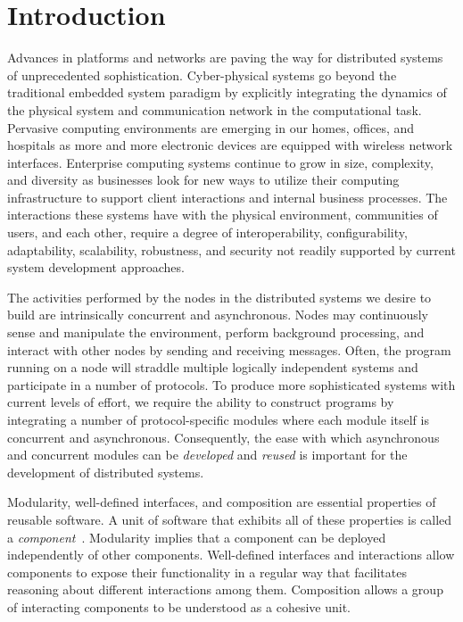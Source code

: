 \section{Introduction\label{introduction}}

Advances in platforms and networks are paving the way for distributed systems of unprecedented sophistication.
Cyber-physical systems go beyond the traditional embedded system paradigm by explicitly integrating the dynamics of the physical system and communication network in the computational task.
Pervasive computing environments are emerging in our homes, offices, and hospitals as more and more electronic devices are equipped with wireless network interfaces.
Enterprise computing systems continue to grow in size, complexity, and diversity as businesses look for new ways to utilize their computing infrastructure to support client interactions and internal business processes.
The interactions these systems have with the physical environment, communities of users, and each other, require a degree of interoperability, configurability, adaptability, scalability, robustness, and security not readily supported by current system development approaches.

The activities performed by the nodes in the distributed systems we desire to build are intrinsically concurrent and asynchronous.
Nodes may continuously sense and manipulate the environment, perform background processing, and interact with other nodes by sending and receiving messages.
Often, the program running on a node will straddle multiple logically independent systems and participate in a number of protocols.
To produce more sophisticated systems with current levels of effort, we require the ability to construct programs by integrating a number of protocol-specific modules where each module itself is concurrent and asynchronous.
Consequently, the ease with which asynchronous and concurrent modules can be \emph{developed} and \emph{reused} is important for the development of distributed systems.

Modularity, well-defined interfaces, and composition are essential properties of reusable software.
A unit of software that exhibits all of these properties is called a \emph{component}~\cite{szyperski2002component}.
Modularity implies that a component can be deployed independently of other components.
Well-defined interfaces and interactions allow components to expose their functionality in a regular way that facilitates reasoning about different interactions among them.
Composition allows a group of interacting components to be understood as a cohesive unit.

